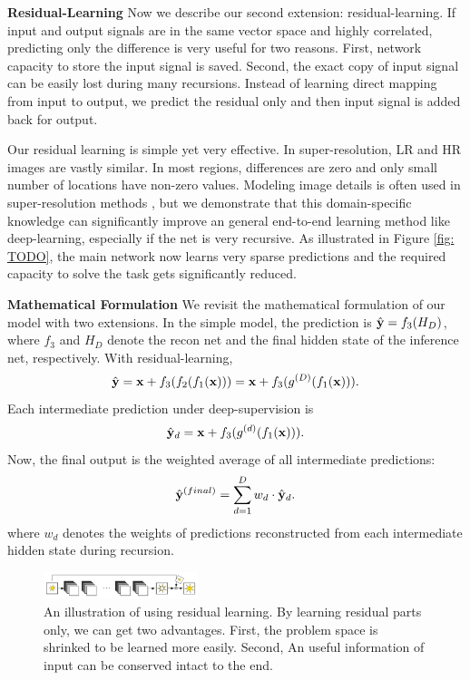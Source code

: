 \documentclass[10pt,twocolumn,letterpaper]{article}
\begin{document}
\textbf{Residual-Learning} Now we describe our second extension: residual-learning. If input and output signals are in the same vector space and highly correlated, predicting only the difference is very useful for two reasons. First, network capacity to store the input signal is saved. Second, the exact copy of input signal can be easily lost during many recursions. Instead of learning direct mapping from input to output, we predict the residual only and then input signal is added back for output.

Our residual learning is simple yet very effective. In super-resolution, LR and HR images are vastly similar. In most regions, differences are zero and only small number of locations have non-zero values. Modeling image details is often used in super-resolution methods \cite{Timofte2013, Timofte, bevilacqua2012,bevilacqua2013super}, but we demonstrate that this domain-specific knowledge can significantly improve an general end-to-end learning method like deep-learning, especially if the net is very recursive.
As illustrated in Figure \ref{fig: TODO}, the main network now learns very sparse predictions and the required capacity to solve the task gets significantly reduced. 

\textbf{Mathematical Formulation} We revisit the mathematical formulation of our model with two extensions. In the simple model, the prediction is $\hat{{\bf y}} = f_3(H_D)$, where $f_3$ and $H_D$ denote the recon net and the final hidden state of the inference net, respectively. With residual-learning,  
\begin{equation}
\hat{{\bf y}} = {\bf x} + f_3(f_2(f_1({\bf x}))) = {\bf x} + f_3(g^{(D)}(f_1({\bf x}))).
\end{equation}
Each intermediate prediction under deep-supervision is 
\begin{equation}
\hat{{\bf y}}_{d} = {\bf x} + f_3(g^{(d)}(f_1({\bf x}))).
\end{equation}
Now, the final output is the weighted average of all intermediate predictions:
\begin{equation}
\hat{{\bf y}}^{(final)} = \sum_{d=1}^{D} w_d \cdot \hat{{\bf y}}_d.
\end{equation}
where $w_d$ denotes the weights of predictions reconstructed from each intermediate hidden state during recursion.

\begin{figure}
\begin{center}
	\includegraphics[width=0.4\textwidth]{figs/f4}
	\caption{An illustration of using residual learning. By learning residual parts only, we can get two advantages. First, the problem space is shrinked to be learned more easily. Second, An useful information of input can be conserved intact to the end.}
\end{center}
\end{figure}
\end{document}
